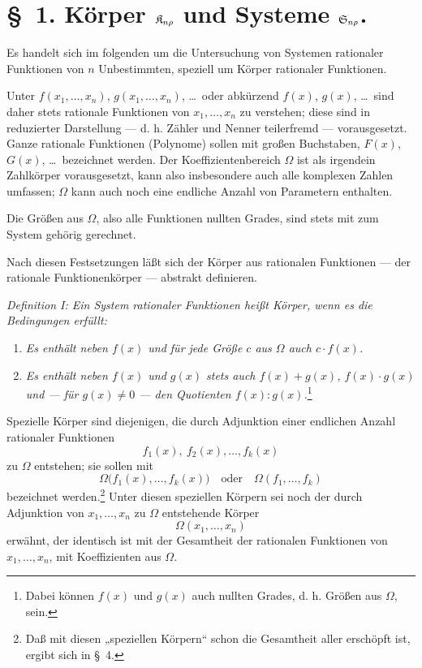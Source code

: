 \section*{\S\ 1. Körper $\mathfrak{K}_{n\rho}$ und Systeme $\mathfrak{S}_{n\rho}$.}

Es handelt sich im folgenden um die Untersuchung von Systemen rationaler Funktionen von $n$ Unbestimmten, speziell um Körper rationaler Funktionen.

Unter $f(x_1,\ldots,x_n)$, $g(x_1,\ldots,x_n)$, \ldots\ oder abkürzend $f(x)$, $g(x)$, \ldots\ sind daher stets rationale Funktionen von $x_1,\ldots,x_n$ zu verstehen; diese sind in reduzierter Darstellung --- d. h. Zähler und Nenner teilerfremd --- vorausgesetzt. Ganze rationale Funktionen (Polynome) sollen mit großen Buchstaben, $F(x)$, $G(x)$, \ldots\ bezeichnet werden. Der Koeffizientenbereich $\Omega$ ist als irgendein Zahlkörper vorausgesetzt, kann also insbesondere auch alle komplexen Zahlen umfassen; $\Omega$ kann auch noch eine endliche Anzahl von Parametern enthalten.

Die Größen aus $\Omega$, also alle Funktionen nullten Grades, sind stets mit zum System gehörig gerechnet.

Nach diesen Festsetzungen läßt sich der Körper aus rationalen Funktionen --- der rationale Funktionenkörper --- abstrakt definieren.

\emph{Definition I: Ein System rationaler Funktionen heißt Körper, wenn es die Bedingungen erfüllt:}
\begin{enumerate}
\item \emph{Es enthält neben $f(x)$ und für jede Größe $c$ aus $\Omega$ auch $c\cdot f(x)$.}
\item \emph{Es enthält neben $f(x)$ und $g(x)$ stets auch $f(x)+g(x)$, $f(x)\cdot g(x)$ und --- für $g(x)\ne0$ --- den Quotienten $f(x):g(x)$.}\footnote{Dabei können $f(x)$ und $g(x)$ auch nullten Grades, d. h. Größen aus $\Omega$, sein.}
\end{enumerate}
Spezielle Körper sind diejenigen, die durch Adjunktion einer endlichen Anzahl rationaler Funktionen
\[
  f_1(x),\ f_2(x),\ldots, f_k(x)
\]
zu $\Omega$ entstehen; sie sollen mit
\[
  \Omega\bigl(f_1(x),\ldots,f_k(x)\bigr)
  \quad\text{oder}\quad
  \Omega(f_1,\ldots,f_k)
\]
bezeichnet werden.\footnote{Daß mit diesen „speziellen Körpern“ schon die Gesamtheit aller erschöpft ist, ergibt sich in \S\ 4.} Unter diesen speziellen Körpern sei noch der durch Adjunktion von $x_1,\ldots,x_n$ zu $\Omega$ entstehende Körper
\[
  \Omega(x_1,\ldots,x_n)
\]
erwähnt, der identisch ist mit der Gesamtheit der rationalen Funktionen von $x_1,\ldots,x_n$, mit Koeffizienten aus $\Omega$.

